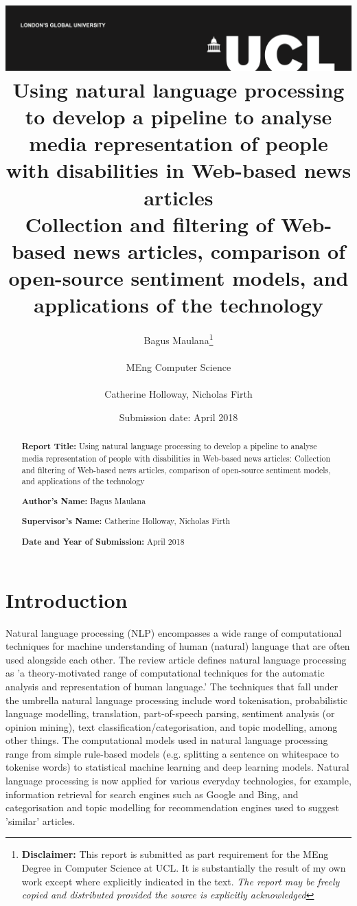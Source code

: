 \documentclass{report}
\title{{\vspace{-14em} \includegraphics[scale=0.4]{ucl_logo.png}}\\
{{\Huge Using natural language processing to develop a pipeline to analyse media representation of people with disabilities in Web-based news articles}}\\
{\large Collection and filtering of Web-based news articles, comparison of open-source sentiment models, and applications of the technology
}\\
}
\date{Submission date: \nth{30} April 2018}
\author{Bagus Maulana\thanks{
{\bf Disclaimer:}
This report is submitted as part requirement for the MEng Degree in Computer Science at UCL. It is
substantially the result of my own work except where explicitly indicated in the text.
\emph{The report may be freely copied and distributed provided the source is explicitly acknowledged}}
\\ \\
MEng Computer Science\\ \\
Catherine Holloway, Nicholas Firth}
\begin{document}
 
\onehalfspacing
\maketitle
\begin{abstract}

\textbf{Report Title:}  Using natural language processing to develop a pipeline to analyse media representation of people with disabilities in Web-based news articles: Collection and filtering of Web-based news articles, comparison of open-source sentiment models, and applications of the technology

\textbf{Author’s Name:} Bagus Maulana

\textbf{Supervisor’s Name:} Catherine Holloway, Nicholas Firth

\textbf{Date and Year of Submission:}  April 2018\\





\end{abstract}
\tableofcontents
\setcounter{page}{1}


\chapter{Introduction} %


Natural language processing (NLP) encompasses a wide range of computational techniques for machine understanding of human (natural) language that are often used alongside each other.
The review article \cite{Jumping NLP Curves} defines natural language processing as 'a theory-motivated range of computational techniques for the automatic analysis and representation of human language.'
The techniques that fall under the umbrella natural language processing include word tokenisation, probabilistic language modelling, translation, part-of-speech parsing, sentiment analysis (or opinion mining), text classification/categorisation, and topic modelling, among other things.
The computational models used in natural language processing range from simple rule-based models (e.g. splitting a sentence on whitespace to tokenise words) to statistical machine learning and deep learning models.
Natural language processing is now applied for various everyday technologies, for example, information retrieval for search engines such as Google and Bing, and categorisation and topic modelling for recommendation engines used to suggest 'similar' articles.
\end{document}
